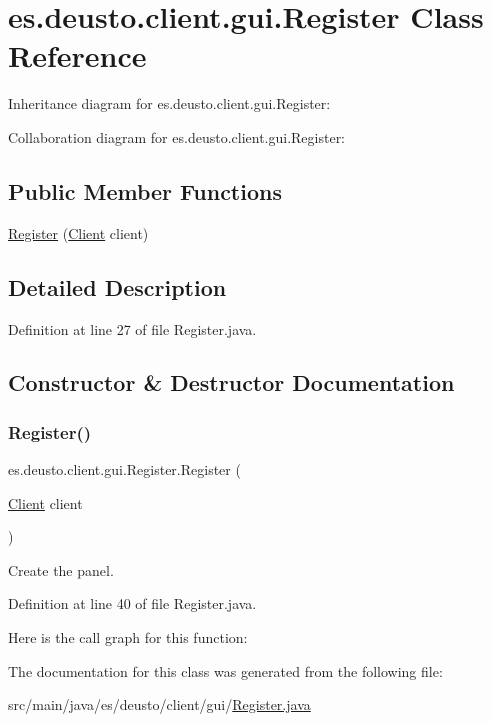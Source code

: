 \hypertarget{classes_1_1deusto_1_1client_1_1gui_1_1_register}{}\section{es.\+deusto.\+client.\+gui.\+Register Class Reference}
\label{classes_1_1deusto_1_1client_1_1gui_1_1_register}


Inheritance diagram for es.\+deusto.\+client.\+gui.\+Register\+:


Collaboration diagram for es.\+deusto.\+client.\+gui.\+Register\+:
\subsection*{Public Member Functions}
\begin{DoxyCompactItemize}
\item 
\mbox{\hyperlink{classes_1_1deusto_1_1client_1_1gui_1_1_register_a5b463722d846413a2b1e929207c0f20d}{Register}} (\mbox{\hyperlink{classes_1_1deusto_1_1client_1_1_client}{Client}} client)
\end{DoxyCompactItemize}


\subsection{Detailed Description}


Definition at line 27 of file Register.\+java.



\subsection{Constructor \& Destructor Documentation}
\mbox{\label{classes_1_1deusto_1_1client_1_1gui_1_1_register_a5b463722d846413a2b1e929207c0f20d}} 
\subsubsection{\texorpdfstring{Register()}{Register()}}
{\footnotesize\ttfamily es.\+deusto.\+client.\+gui.\+Register.\+Register (\begin{DoxyParamCaption}\item[{\mbox{\hyperlink{classes_1_1deusto_1_1client_1_1_client}{Client}}}]{client }\end{DoxyParamCaption})}

Create the panel. 

Definition at line 40 of file Register.\+java.

Here is the call graph for this function\+:


The documentation for this class was generated from the following file\+:\begin{DoxyCompactItemize}
\item 
src/main/java/es/deusto/client/gui/\mbox{\hyperlink{_register_8java}{Register.\+java}}\end{DoxyCompactItemize}
